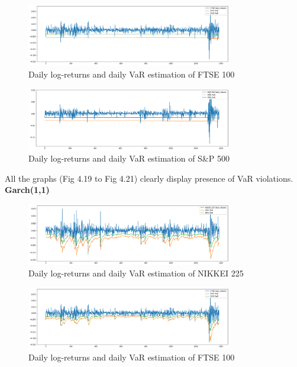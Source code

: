 \documentclass[a4paper,11pt,oneside]{book}
\begin{document}
\begin{figure}[!h]
	\centering
	\includegraphics[width=0.8\textwidth]{figures/HISTF}
	\caption{Daily log-returns and daily VaR estimation of FTSE 100}
	\label{HistF}
\end{figure}

\begin{figure}[!h]
	\centering
	\includegraphics[width=0.8\textwidth]{figures/HISTS}
	\caption{Daily log-returns and daily VaR estimation of S\&P 500}
	\label{HistS}
\end{figure}
All the graphs (Fig 4.19 to Fig 4.21) clearly display presence of VaR violations.
\newpage
	\textbf{Garch(1,1)}
\begin{figure}[!h]
	\centering
	\includegraphics[width=0.8\textwidth]{figures/GARCHN}
	\caption{Daily log-returns and daily VaR estimation of NIKKEI 225}
	\label{garchN}
\end{figure}

\begin{figure}[!h]
	\centering
	\includegraphics[width=0.8\textwidth]{figures/GARCHF}
	\caption{Daily log-returns and daily VaR estimation of FTSE 100}
	\label{garchF}
\end{figure}
\end{document}
